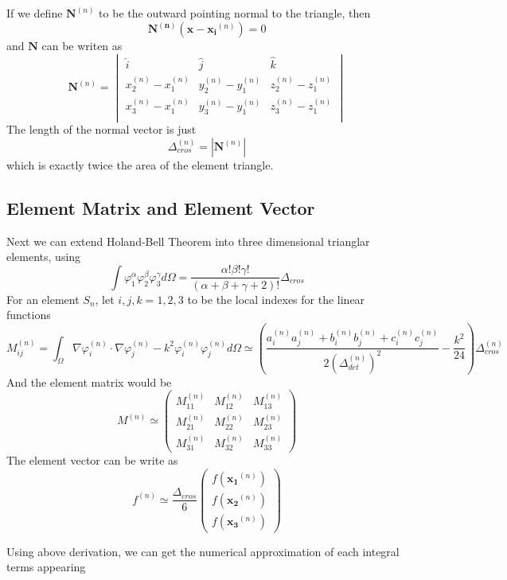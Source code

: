 \documentclass[a4paper]{article}
\renewcommand{\vec}[1]{\mathbf{#1}}
\begin{document}
If we define \(\vec{N}^{(n)}\) to be the outward pointing normal to the triangle,
then 
\[
\vec{N^{(n)}}(\vec{x}-\vec{x_i}^{(n)})=0    
\]
and \(\vec{N}\) can be writen as 
\[
    \vec{N}^{(n)}=\begin{vmatrix}
        \hat i &\hat j &\hat k\\
        x_2^{(n)}-x_1^{(n)} & y_2^{(n)}-y_1^{(n)} & z_2^{(n)}-z_1^{(n)} \\
        x_3^{(n)}-x_1^{(n)} & y_3^{(n)}-y_1^{(n)} & z_3^{(n)}-z_1^{(n)} \\
    \end{vmatrix}
\]
The length of the normal vector is just 
\[
\Delta_{cros}^{(n)}=|\vec{N}^{(n)}|
\]
which is exactly twice the area of the element triangle. 

\subsection{Element Matrix and Element Vector}
Next we can extend Holand-Bell Theorem into three dimensional trianglar elements,
using 
\[
\int \varphi_1^\alpha \varphi_2^\beta \varphi_3^\gamma d\Omega=\frac{\alpha!\beta!\gamma!}{(\alpha+\beta+\gamma+2)!}  \Delta_{cros}
\]
For an element $S_n$, let $i,j,k=1,2,3$ to be the local indexes for the linear functions
\[
M^{(n)}_{ij}= \int_\Omega \nabla \varphi_{i}^{(n)} \cdot \nabla \varphi_{j}^{(n)}-k^{2}\varphi_{i}^{(n)} \varphi_{j}^{(n)}  d\Omega
\simeq \left(\frac{a_i^{(n)} a_j^{(n)}+b_i^{(n)}b_j^{(n)}+c_i^{(n)} c_j^{(n)}}{2(\Delta_{det}^{(n)})^2}-\frac{k^2}{24}\right)\Delta_{cros}^{(n)}
\]
And the element matrix would be 
\[
    M^{(n)}\simeq \begin{pmatrix}
        M^{(n)}_{11} &M^{(n)}_{12} & M^{(n)}_{13}\\
        M^{(n)}_{21} & M^{(n)}_{22} & M^{(n)}_{23}\\
        M^{(n)}_{31} & M^{(n)}_{32} & M^{(n)}_{33} 
    \end{pmatrix}
\]
The element vector can be write as 
\[
   f^{(n)}\simeq \frac{\Delta_{cros}}{6}\begin{pmatrix}
    f(\vec{x_1}^{(n)})\\f(\vec{x_2}^{(n)})\\f(\vec{x_3}^{(n)})
   \end{pmatrix} 
\]

Using above derivation, we can get the numerical approximation of each integral 
terms appearing
\end{document}
